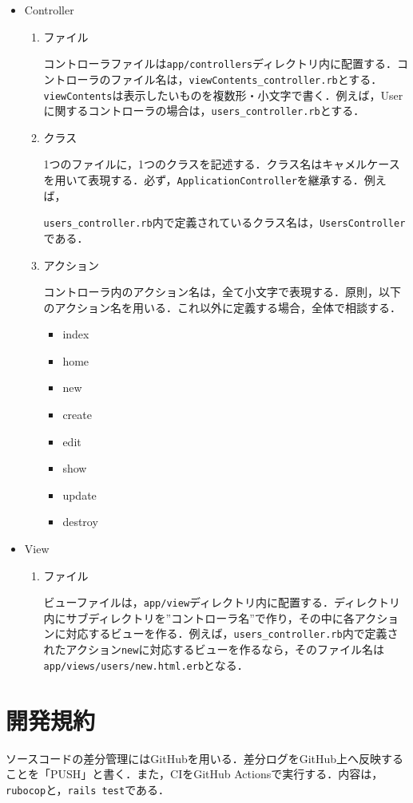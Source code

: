 \begin{itemize}
    \item Controller
    \begin{enumerate}
        \item ファイル

        コントローラファイルは\texttt{app/controllers}ディレクトリ内に配置する．コントローラのファイル名は，\texttt{viewContents\_controller.rb}とする．\texttt{viewContents}は表示したいものを複数形・小文字で書く．例えば，Userに関するコントローラの場合は，\texttt{users\_controller.rb}とする．
        \item クラス

        1つのファイルに，1つのクラスを記述する．クラス名はキャメルケースを用いて表現する．必ず，\texttt{ApplicationController}を継承する．例えば，
        
        \texttt{users\_controller.rb}内で定義されているクラス名は，\texttt{UsersController}である．
        \item アクション

        コントローラ内のアクション名は，全て小文字で表現する．原則，以下のアクション名を用いる．これ以外に定義する場合，全体で相談する．
        \begin{itemize}
            \item index
            \item home
            \item new
            \item create
            \item edit
            \item show
            \item update
            \item destroy
        \end{itemize}
    \end{enumerate}
    \item View
    \begin{enumerate}
        \item ファイル

        ビューファイルは，\texttt{app/view}ディレクトリ内に配置する．ディレクトリ内にサブディレクトリを”コントローラ名”で作り，その中に各アクションに対応するビューを作る．例えば，\texttt{users\_controller.rb}内で定義されたアクション\texttt{new}に対応するビューを作るなら，そのファイル名は\texttt{app/views/users/new.html.erb}となる．
    \end{enumerate}
\end{itemize}

\section{開発規約}\label{q3.3}
ソースコードの差分管理にはGitHubを用いる．差分ログをGitHub上へ反映することを「PUSH」と書く．また，CIをGitHub Actionsで実行する．内容は，\texttt{rubocop}と，\texttt{rails test}である．
